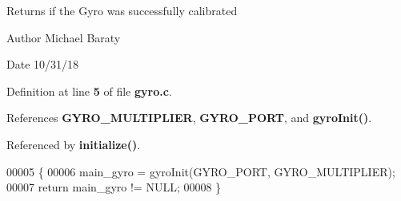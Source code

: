 \begin{DoxyReturn}{Returns}
if the Gyro was successfully calibrated 
\end{DoxyReturn}
\begin{DoxyAuthor}{Author}
Michael Baraty 
\end{DoxyAuthor}
\begin{DoxyDate}{Date}
10/31/18 
\end{DoxyDate}


Definition at line \textbf{ 5} of file \textbf{ gyro.\+c}.



References \textbf{ G\+Y\+R\+O\+\_\+\+M\+U\+L\+T\+I\+P\+L\+I\+ER}, \textbf{ G\+Y\+R\+O\+\_\+\+P\+O\+RT}, and \textbf{ gyro\+Init()}.



Referenced by \textbf{ initialize()}.


\begin{DoxyCode}
00005                       \{
00006   main\_gyro = gyroInit(GYRO_PORT, GYRO_MULTIPLIER);
00007   \textcolor{keywordflow}{return} main\_gyro != NULL;
00008 \}
\end{DoxyCode}
